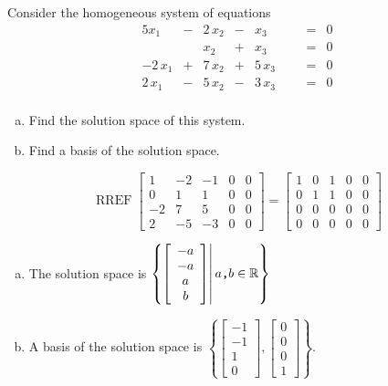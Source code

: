 
\begin{exerciseStatement}


Consider the homogeneous system of equations 
\begin{alignat*}{5} x_{1} &-& 2 \, x_{2} &-& x_{3} & &  &=& 0 \\ & & x_{2} &+& x_{3} & &  &=& 0 \\-2 \, x_{1} &+& 7 \, x_{2} &+& 5 \, x_{3} & &  &=& 0 \\2 \, x_{1} &-& 5 \, x_{2} &-& 3 \, x_{3} & &  &=& 0 \\ \end{alignat*}
            


\begin{enumerate}[(a)]
\item  Find the solution space of this system.
\item  Find a basis of the solution space.
\end{enumerate}
    
\end{exerciseStatement}
    
\begin{exerciseAnswer} 


\[\operatorname{RREF} \left[\begin{array}{cccc|c}
1 & -2 & -1 & 0 & 0 \\
0 & 1 & 1 & 0 & 0 \\
-2 & 7 & 5 & 0 & 0 \\
2 & -5 & -3 & 0 & 0
\end{array}\right] = \left[\begin{array}{cccc|c}
1 & 0 & 1 & 0 & 0 \\
0 & 1 & 1 & 0 & 0 \\
0 & 0 & 0 & 0 & 0 \\
0 & 0 & 0 & 0 & 0
\end{array}\right] \]


\begin{enumerate}[(a)]
\item The solution space is \( \left\{ \left[\begin{array}{c}
-a \\
-a \\
a \\
b
\end{array}\right] \middle|\,a\text{\texttt{,}}b\in\mathbb{R}\right\} \)
\item A basis of the solution space is \( \left\{ \left[\begin{array}{c}
-1 \\
-1 \\
1 \\
0
\end{array}\right] , \left[\begin{array}{c}
0 \\
0 \\
0 \\
1
\end{array}\right] \right\} \).
\end{enumerate}
    
\end{exerciseAnswer}
    
